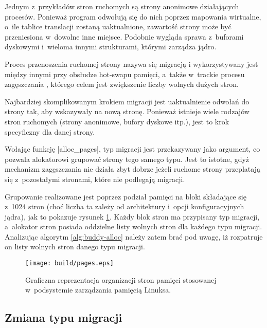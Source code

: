 Jednym z~przykładów stron ruchomych są strony anonimowe działających
procesów.  Ponieważ program odwołują się do nich poprzez mapowania
wirtualne, o~ile tablice translacji zostaną uaktualnione, zawartość
strony może być przeniesiona w~dowolne inne miejsce.  Podobnie wygląda
sprawa z~buforami dyskowymi i~wieloma innymi strukturami, którymi
zarządza jądro.

Proces przenoszenia ruchomej strony nazywa się migracją
i wykorzystywany jest między innymi przy obsłudze hot-swapu pamięci,
a~także w~trackie procesu zagęszczania \autocite{bib:compaction,
  bib:supporting-large-contig-regions}, którego celem jest zwiększenie
liczby wolnych dużych stron.

Najbardziej skomplikowanym krokiem migracji jest uaktualnienie odwołań
do strony tak, aby wskazywały na nową stronę.  Ponieważ istnieje wiele
rodzajów stron ruchomych (strony anonimowe, bufory dyskowe itp.), jest
to krok specyficzny dla danej strony.

Wołając funkcję \code|alloc_pages|, typ migracji jest przekazywany
jako argument, co pozwala alokatorowi grupować strony tego samego
typu.  Jest to istotne, gdyż mechanizm zagęszczania nie działa zbyt
dobrze jeżeli ruchome strony przeplatają się z~pozostałymi stronami,
które nie podlegają migracji.

Grupowanie realizowane jest poprzez podział pamięci na bloki
składające się z~1024 stron (choć liczba ta zależy od architektury
i~opcji konfiguracyjnych jądra), jak to pokazuje rysunek
\ref{fig:pages}.  Każdy blok stron ma przypisany typ migracji,
a~alokator stron posiada oddzielne listy wolnych stron dla każdego
typu migracji.  Analizując algorytm \ref{alg:buddy-alloc} należy zatem
brać pod uwagę, iż rozpatruje on listy wolnych stron danego typu
migracji.

\begin{figure}[btp]
\begin{center}
\texttt{[image: build/pages.eps]}
\end{center}
\caption[Organizacja pamięci w~Linuksie.]{Graficzna reprezentacja
  organizacji stron pamięci stosowanej w~podsystemie zarządzania
  pamięcią Linuksa.}
\label{fig:pages}
\end{figure}


\subsection{Zmiana typu migracji}\label{sec:type-change}

